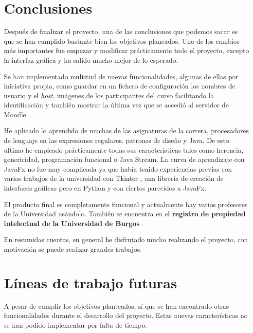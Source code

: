
\section{Conclusiones}

Después de finalizar el proyecto, una de las conclusiones que podemos sacar es que se han cumplido bastante bien los objetivos planeados. Uno de los cambios más importantes fue empezar y modificar prácticamente todo el proyecto, excepto la interfaz gráfica y ha salido mucho mejor de lo esperado. 

Se han implementado multitud de nuevas funcionalidades, algunas de ellas por iniciativa propia, como guardar en un fichero de configuración los nombres de usuario y el \textit{host}, imágenes de los participantes del curso facilitando la identificación y también mostrar la última vez que se accedió al servidor de Moodle.

He aplicado lo aprendido de muchas de las asignaturas de la carrera, procesadores de lenguaje en las expresiones regulares, patrones de diseño y Java. De esto último he empleado prácticamente todas sus características tales como herencia, genericidad, programación funcional o Java Stream. La curva de aprendizaje con JavaFx no fue muy complicada ya que había tenido experiencias previas con varios trabajos de la universidad con Tkinter \cite{noauthor_tkinter_nodate}, una librería de creación de interfaces gráficas pero en Python y con ciertos parecidos a JavaFx.

El producto final es completamente funcional y actualmente hay varios profesores de la Universidad usándolo. También se encuentra en el \textbf{registro de propiedad intelectual  de la Universidad de Burgos} \cite{noauthor_registros_nodate}.

En resumidas cuentas, en general he disfrutado mucho realizando el proyecto, con motivación se puede realizar grandes trabajos.

\section{Líneas de trabajo futuras}

A pesar de cumplir los objetivos planteados, sí que se han encontrado otras funcionalidades durante el desarrollo del proyecto. Estas nuevas características no se han podido implementar por falta de tiempo.

